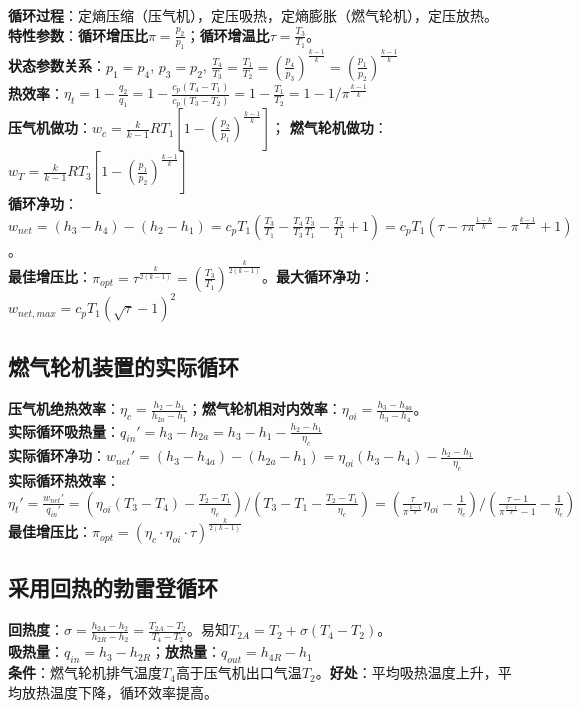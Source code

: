 \documentclass[a4paper,9pt]{ctexart}
\begin{document}
\noindent
\textbf{循环过程}：定熵压缩（压气机），定压吸热，定熵膨胀（燃气轮机），定压放热。\\
\textbf{特性参数}：\textbf{循环增压比}$\pi=\frac{p_2}{p_1}$；\textbf{循环增温比}$\tau=\frac{T_3}{T_1}$。\\
\textbf{状态参数关系}：$p_1=p_4$, $p_3=p_2$, $\frac{T_4}{T_3}=\frac{T_1}{T_2}=\left(\frac{p_4}{p_3}\right)^{\frac{k-1}{k}}=\left(\frac{p_1}{p_2}\right)^{\frac{k-1}{k}}$\\
\textbf{热效率}：$\eta_t=1-\frac{q_2}{q_1}=1-\frac{c_p(T_4-T_1)}{c_p(T_3-T_2)}=1-\frac{T_1}{T_2}=1-1/\pi^{\frac{k-1}{k}}$\\
\textbf{压气机做功}：$w_c=\frac{k}{k-1}RT_1\left[1-(\frac{p_2}{p_1})^{\frac{k-1}{k}}\right]$；
\textbf{燃气轮机做功}：$w_T=\frac{k}{k-1}RT_3\left[1-(\frac{p_1}{p_2})^{\frac{k-1}{k}}\right]$\\
\textbf{循环净功}：$w_{net}=(h_3-h_4)-(h_2-h_1)=c_pT_1(\frac{T_3}{T_1}-\frac{T_4}{T_3}\frac{T_3}{T_1}-\frac{T_2}{T_1}+1)=c_pT_1(\tau-\tau\pi^{\frac{1-k}{k}}-\pi^{\frac{k-1}{k}}+1)$。\\
\textbf{最佳增压比}：$\pi_{opt}=\tau^{\frac{k}{2(k-1)}}=\left(\frac{T_3}{T_1}\right)^{\frac{k}{2(k-1)}}$。\textbf{最大循环净功}：$w_{net, max}=c_pT_1(\sqrt{\tau}-1)^2$

\subsection{燃气轮机装置的实际循环}
\noindent
\textbf{压气机绝热效率}：$\eta_c=\frac{h_2-h_1}{h_{2a}-h_1}$；\textbf{燃气轮机相对内效率}：$\eta_{oi}=\frac{h_3-h_{4a}}{h_3-h_4}$。\\
\textbf{实际循环吸热量}：$q_{in}'=h_3-h_{2a}=h_3-h_1-\frac{h_2-h_1}{\eta_c}$\\
\textbf{实际循环净功}：$w_{net}'=(h_3-h_{4a})-(h_{2a}-h_1)=\eta_{oi}(h_3-h_4)-\frac{h_2-h_1}{\eta_c}$
\\
\textbf{实际循环热效率}：$\eta_t'=\frac{w_{net}'}{q_{in}'}=\left(\eta_{oi}(T_3-T_4)-\frac{T_2-T_1}{\eta_{c}}\right)/\left(T_3-T_1-\frac{T_2-T_1}{\eta_c}\right)=\left(\frac{\tau}{\pi^{\frac{k-1}{k}}}\eta_{oi}-\frac{1}{\eta_c}\right)/\left(\frac{\tau-1}{\pi^{\frac{k-1}{k}}-1}-\frac{1}{\eta_c}\right)$
\\
\textbf{最佳增压比}：$\pi_{opt}=(\eta_c\cdot\eta_{oi}\cdot\tau)^{\frac{k}{2(k-1)}}$


\subsection{采用回热的勃雷登循环}
\noindent
\textbf{回热度}：$\sigma=\frac{h_{2A}-h_2}{h_{2R}-h_2}=\frac{T_{2A}-T_2}{T_4-T_2}$。易知$T_{2A}=T_2+\sigma(T_4-T_2)$。\\
\textbf{吸热量}：$q_{in}=h_3-h_{2R}$；\textbf{放热量}：$q_{out}=h_{4R}-h_1$\\
\textbf{条件}：燃气轮机排气温度$T_4$高于压气机出口气温$T_2$。\textbf{好处}：平均吸热温度上升，平均放热温度下降，循环效率提高。
\end{document}
